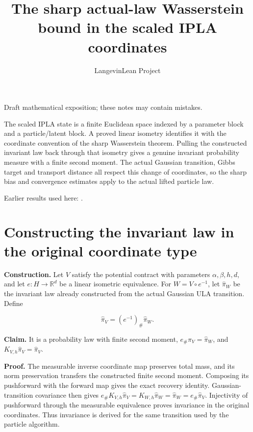 \documentclass[11pt,a4paper]{article}
\title{\texorpdfstring{The sharp actual-law Wasserstein bound in the scaled IPLA coordinates}{The sharp actual-law Wasserstein bound in the scaled IPLA coordinates}}
\author{LangevinLean Project}
\date{}
\begin{document}
\maketitle
Draft mathematical exposition; these notes may contain mistakes.


The scaled IPLA state is a finite Euclidean space indexed by a parameter block and a particle/\allowbreak{}latent block. A proved linear isometry identifies it with the coordinate convention of the sharp Wasserstein theorem. Pulling the constructed invariant law back through that isometry gives a genuine invariant probability measure with a finite second moment. The actual Gaussian transition, Gibbs target and transport distance all respect this change of coordinates, so the sharp bias and convergence estimates apply to the actual lifted particle law.



Earlier results used here: \cite[Section~3.16]{LangevinLean2026IPLA}.

\section{\texorpdfstring{Constructing the invariant law in the original coordinate type}{Constructing the invariant law in the original coordinate type}}


\textbf{Construction.} Let \(V\) satisfy the potential contract with parameters \(\alpha,\beta,h,d\), and let \(e:H\to\mathbb R^d\) be a linear isometric equivalence. For \(W=V\circ e^{-1}\), let \(\widehat\pi_W\) be the invariant law already constructed from the actual Gaussian ULA transition. Define

\[\widehat\pi_V=(e^{-1})_\#\widehat\pi_W.\]


\textbf{Claim.} It is a probability law with finite second moment, \(e_\#\widehat\pi_V=\widehat\pi_W\), and \(K_{V,h}\widehat\pi_V=\widehat\pi_V\).




\textbf{Proof.} The measurable inverse coordinate map preserves total mass, and its norm preservation transfers the constructed finite second moment. Composing its pushforward with the forward map gives the exact recovery identity. Gaussian-transition covariance then gives \(e_\#K_{V,h}\widehat\pi_V=K_{W,h}\widehat\pi_W=\widehat\pi_W=e_\#\widehat\pi_V\). Injectivity of pushforward through the measurable equivalence proves invariance in the original coordinates. Thus invariance is derived for the same transition used by the particle algorithm.
\end{document}
